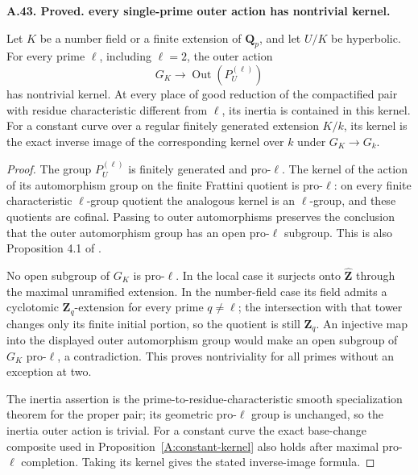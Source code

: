 \documentclass[11pt,oneside]{article}
\makeatletter
\newcounter{statementanchor}
\newenvironment{statement}[3]{%
 \refstepcounter{statementanchor}\def\@currentlabel{#1}%
 \par\addvspace{9pt}\noindent
 \textbf{#1. #2. #3.}\par\nobreak\noindent\ignorespaces
}{\par\addvspace{5pt}}
\makeatother
\begin{document}
\begin{statement}{A.43}{Proved}{every single-prime outer action has nontrivial kernel}
\label{st:A.43}
\label{A:proprime-kernels}
Let $K$ be a number field or a finite extension of
$\mathbf Q_p$, and let $U/K$ be hyperbolic. For every prime
$\ell$, including $\ell=2$, the outer action
\[
 G_K\longrightarrow\operatorname{Out}(P_U^{(\ell)})
\]
has nontrivial kernel. At every place of good reduction of
the compactified pair with residue characteristic different
from $\ell$, its inertia is contained in this kernel.
For a constant curve over a regular finitely generated
extension $K/k$, its kernel is the exact inverse image of
the corresponding kernel over $k$ under $G_K\to G_k$.
\end{statement}
\begin{proof}
The group $P_U^{(\ell)}$ is finitely generated and pro-$\ell$.
The kernel of the action of its automorphism group on the
finite Frattini quotient is pro-$\ell$: on every finite
characteristic $\ell$-group quotient the analogous kernel is
an $\ell$-group, and these quotients are cofinal. Passing to
outer automorphisms preserves the conclusion that the outer
automorphism group has an open pro-$\ell$ subgroup. This is
also Proposition 4.1 of \cite{A_Mochizuki2006}.

No open subgroup of $G_K$ is pro-$\ell$. In the local case
it surjects onto $\widehat{\mathbf Z}$ through the maximal
unramified extension. In the number-field case its field
admits a cyclotomic $\mathbf Z_q$-extension for every prime
$q\ne\ell$; the intersection with that tower changes only
its finite initial portion, so the quotient is still
$\mathbf Z_q$. An injective map into the displayed outer
automorphism group would make an open subgroup of $G_K$
pro-$\ell$, a contradiction. This proves nontriviality for
all primes without an exception at two.

The inertia assertion is the prime-to-residue-characteristic
smooth specialization theorem for the proper pair; its
geometric pro-$\ell$ group is unchanged, so the inertia
outer action is trivial. For a constant curve the exact
base-change composite used in Proposition~\ref{A:constant-kernel}
also holds after maximal pro-$\ell$ completion. Taking its
kernel gives the stated inverse-image formula.
\end{proof}
\end{document}
